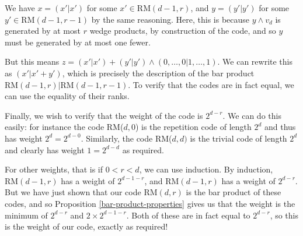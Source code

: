 \documentclass{article}
\begin{document}
\begin{prf}
	We have $x = (x'|x')$ for some $x' \in \mathrm{RM}(d-1, r)$, and $y = (y'|y')$ for some $y' \in \mathrm{RM}(d-1, r-1)$ by the same reasoning. Here, this is because $y \land v_d$ is generated by at most $r$ wedge products, by construction of the code, and so $y$ must be generated by at most one fewer.
	
	But this means $z = (x'|x') + (y'|y') \land (0, \dots, 0|1, \dots, 1)$. We can rewrite this as $(x'|x' + y')$, which is precisely the description of the bar product $\mathrm{RM}(d-1, r)|\mathrm{RM}(d-1, r-1)$. To verify that the codes are in fact equal, we can use the equality of their ranks.
	
	Finally, we wish to verify that the weight of the code is $2^{d-r}$. We can do this easily: for instance the code RM($d, 0$) is the repetition code of length $2^d$ and thus has weight $2^d = 2^{d-0}$. Similarly, the code RM($d, d)$ is the trivial code of length $2^d$ and clearly has weight $1 = 2^{d-d}$ as required.
	
	For other weights, that is if $0 < r < d$, we can use induction. By induction, $\mathrm{RM}(d-1, r)$ has a weight of $2^{d-1-r}$, and $\mathrm{RM}(d-1, r)$ has a weight of $2^{d-r}$. But we have just shown that our code $\mathrm{RM}(d, r)$ is the bar product of these codes, and so Proposition \ref{bar-product-properties} gives us that the weight is the minimum of $2^{d-r}$ and $2 \times 2^{d-1-r}$. Both of these are in fact equal to $2^{d-r}$, so this is the weight of our code, exactly as required!
\end{prf}
\end{document}
